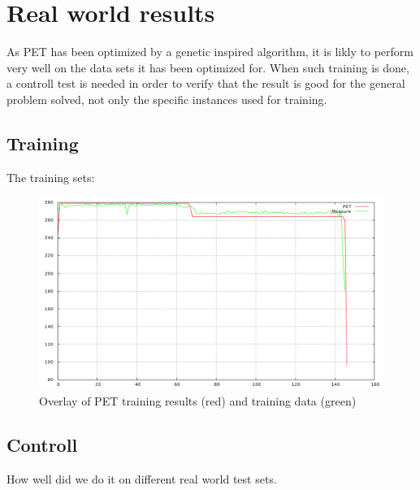\section{Real world results}

As PET has been optimized by a genetic inspired algorithm, it is likly to perform very well on the data sets it
has been optimized for. When such training is done, a controll test is needed in order to verify that the result
is good for the general problem solved, not only the specific instances used for training.

\subsection{Training}

The training sets:
\begin{figure}
\centering
\includegraphics[width=\textwidth]{figs/trend-training.pdf}
\caption{Overlay of PET training results (red) and training data (green)}
\label{fig:trend-training}
\end{figure}

\subsection{Controll}

How well did we do it on different real world test sets.
